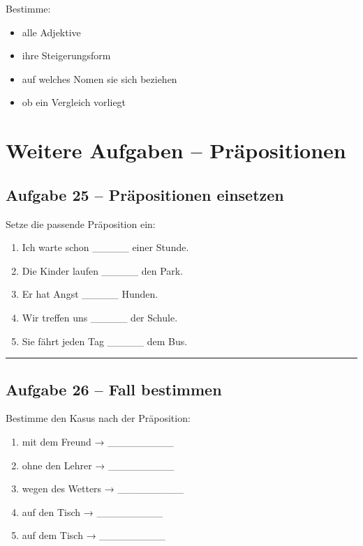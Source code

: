 \documentclass[a4paper,12pt]{article}
\newcommand{\linie}{\vspace{4pt}\hrule\vspace{10pt}}
\begin{document}
Bestimme:
\begin{itemize}
\item alle Adjektive
\item ihre Steigerungsform
\item auf welches Nomen sie sich beziehen
\item ob ein Vergleich vorliegt
\end{itemize}

\newpage
\section*{Weitere Aufgaben – Präpositionen}

\subsection*{Aufgabe 25 – Präpositionen einsetzen}

Setze die passende Präposition ein:

\begin{enumerate}
\item Ich warte schon \_\_\_\_\_ einer Stunde.
\item Die Kinder laufen \_\_\_\_\_ den Park.
\item Er hat Angst \_\_\_\_\_ Hunden.
\item Wir treffen uns \_\_\_\_\_ der Schule.
\item Sie fährt jeden Tag \_\_\_\_\_ dem Bus.
\end{enumerate}

\linie

\subsection*{Aufgabe 26 – Fall bestimmen}

Bestimme den Kasus nach der Präposition:

\begin{enumerate}
\item mit dem Freund → \_\_\_\_\_\_\_\_\_
\item ohne den Lehrer → \_\_\_\_\_\_\_\_\_
\item wegen des Wetters → \_\_\_\_\_\_\_\_\_
\item auf den Tisch → \_\_\_\_\_\_\_\_\_
\item auf dem Tisch → \_\_\_\_\_\_\_\_\_
\end{enumerate}
\end{document}
